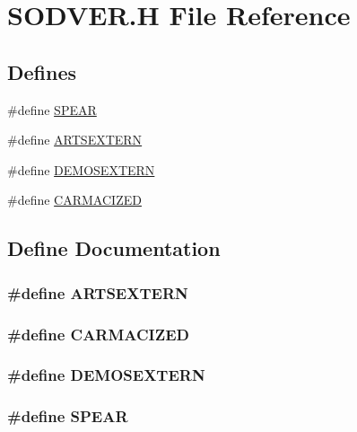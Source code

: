 \hypertarget{SODVER_8H}{
\section{SODVER.H File Reference}
\label{SODVER_8H}
}
\subsection*{Defines}
\begin{DoxyCompactItemize}
\item 
\#define \hyperlink{SODVER_8H_a440ca9e8cf364eaa6707e0cca9e022ca}{SPEAR}
\item 
\#define \hyperlink{SODVER_8H_a36e8622d432bb1dcfc61ac233148b685}{ARTSEXTERN}
\item 
\#define \hyperlink{SODVER_8H_aa38bbec192ab8931f108d382f7833c31}{DEMOSEXTERN}
\item 
\#define \hyperlink{SODVER_8H_ab1d0a23b2e2640f4fbf73f30b3586f1b}{CARMACIZED}
\end{DoxyCompactItemize}


\subsection{Define Documentation}
\hypertarget{SODVER_8H_a36e8622d432bb1dcfc61ac233148b685}{
\subsubsection[{ARTSEXTERN}]{\setlength{\rightskip}{0pt plus 5cm}\#define ARTSEXTERN}}
\label{SODVER_8H_a36e8622d432bb1dcfc61ac233148b685}
\hypertarget{SODVER_8H_ab1d0a23b2e2640f4fbf73f30b3586f1b}{
\subsubsection[{CARMACIZED}]{\setlength{\rightskip}{0pt plus 5cm}\#define CARMACIZED}}
\label{SODVER_8H_ab1d0a23b2e2640f4fbf73f30b3586f1b}
\hypertarget{SODVER_8H_aa38bbec192ab8931f108d382f7833c31}{
\subsubsection[{DEMOSEXTERN}]{\setlength{\rightskip}{0pt plus 5cm}\#define DEMOSEXTERN}}
\label{SODVER_8H_aa38bbec192ab8931f108d382f7833c31}
\hypertarget{SODVER_8H_a440ca9e8cf364eaa6707e0cca9e022ca}{
\subsubsection[{SPEAR}]{\setlength{\rightskip}{0pt plus 5cm}\#define SPEAR}}
\label{SODVER_8H_a440ca9e8cf364eaa6707e0cca9e022ca}
